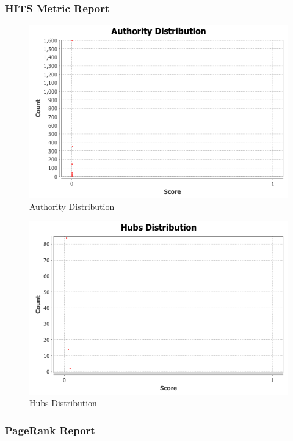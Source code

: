 \documentclass{article}
\begin{document}
\subsubsection*{HITS Metric Report}

\begin{figure}[H]
\centering
\includegraphics[scale=0.70]{q3/HitsMetricReport/authorities}
\caption{Authority Distribution}
\label{authoritydistribution}
\end{figure}

\begin{figure}[H]
\centering
\includegraphics[scale=0.70]{q3/HitsMetricReport/hubs}
\caption{Hubs Distribution}
\label{hubsdistribution}
\end{figure}

\subsubsection*{PageRank Report}
\end{document}
